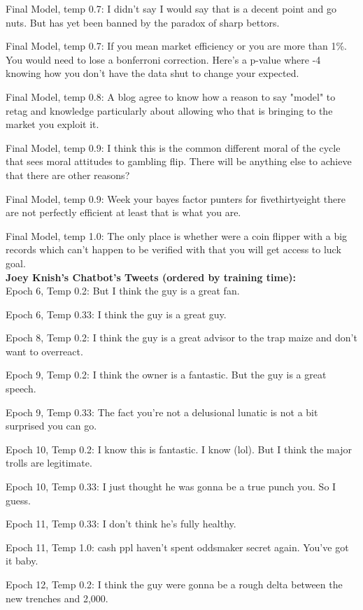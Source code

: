 \documentclass[5p,authoryear]{elsarticle}
\begin{document}
Final Model, temp 0.7: I didn't say I would say that is a decent point and go nuts. But has yet been banned by the paradox of sharp bettors. 

Final Model, temp 0.7: If you mean market efficiency or you are more than 1\%. You would need to lose a bonferroni correction. Here's a p-value where -4 knowing how you don't have the data shut to change your expected.

Final Model, temp 0.8: A blog agree to know how a reason to say "model" to retag and knowledge particularly about allowing who that is bringing to the market you exploit it.

Final Model, temp 0.9: I think this is the common different moral of the cycle that sees moral attitudes to gambling flip. There will be anything else to achieve that there are other reasons?

Final Model, temp 0.9: Week your bayes factor punters for fivethirtyeight there are not perfectly efficient at least that is what you are.


Final Model, temp 1.0: The only place is whether were a coin flipper with a big records which can't happen to be verified with that you will get access to luck goal.\\


\textbf{Joey Knish’s Chatbot’s Tweets (ordered by training time):}\\

Epoch 6, Temp 0.2:
But I think the guy is a great fan. 

Epoch 6, Temp 0.33:
I think the guy is a great guy.

Epoch 8, Temp 0.2:
I think the guy is a great advisor to the trap maize and don’t want to overreact. 

Epoch 9, Temp 0.2:
I think the owner is a fantastic. But the guy is a great speech. 

Epoch 9, Temp 0.33:
The fact you’re not a delusional lunatic is not a bit surprised you can go. 

Epoch 10, Temp 0.2:
I know this is fantastic. I know (lol). But I think the major trolls are legitimate. 


Epoch 10, Temp 0.33:
I just thought he was gonna be a true punch you. So I guess. 


Epoch 11, Temp 0.33:
I don’t think he’s fully healthy.


Epoch 11, Temp 1.0:
cash ppl haven’t spent oddsmaker secret again. You’ve got it baby.

Epoch 12, Temp 0.2:
I think the guy were gonna be a rough delta between the new trenches and 2,000.
\end{document}
